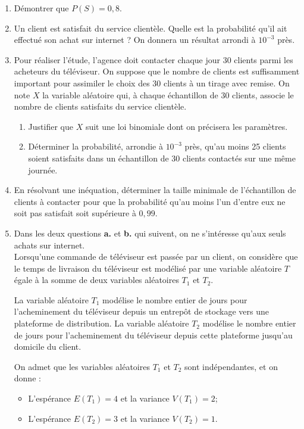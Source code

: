 \documentclass[10pt]{article}
\begin{document}
\begin{enumerate}
	\item Démontrer que $P(S)=0,8$.

	\item Un client est satisfait du service clientèle. Quelle est la probabilité qu'il ait effectué son achat sur internet ? On donnera un résultat arrondi à $10^{-3}$ près.

	\item Pour réaliser l'étude, l'agence doit contacter chaque jour 30 clients parmi les acheteurs du téléviseur. On suppose que le nombre de clients est suffisamment important pour assimiler le choix des 30 clients à un tirage avec remise. On note $X$ la variable aléatoire qui, à chaque échantillon de 30 clients, associe le nombre de clients satisfaits du service clientèle.

	\begin{enumerate}
		\item Justifier que $X$ suit une loi binomiale dont on précisera les paramètres.
		\item Déterminer la probabilité, arrondie à $10^{-3}$ près, qu'au moins 25 clients soient satisfaits dans un échantillon de 30 clients contactés sur une même journée.
	\end{enumerate}

	\item En résolvant une inéquation, déterminer la taille minimale de l'échantillon de clients à contacter pour que la probabilité qu'au moins l'un d'entre eux ne soit pas satisfait soit supérieure à $0,99$.

	\item Dans les deux questions \textbf{a.} et \textbf{b.} qui suivent, on ne s'intéresse qu'aux seuls achats sur internet.\\
	Lorsqu'une commande de téléviseur est passée par un client, on considère que le temps de livraison du téléviseur est modélisé par une variable aléatoire $T$ égale à la somme de deux variables aléatoires $T_{1}$ et $T_{2}$.

	La variable aléatoire $T_{1}$ modélise le nombre entier de jours pour l'acheminement du téléviseur depuis un entrepôt de stockage vers une plateforme de distribution. La variable aléatoire $T_{2}$ modélise le nombre entier de jours pour l'acheminement du téléviseur depuis cette plateforme jusqu'au domicile du client.

	On admet que les variables aléatoires $T_{1}$ et $T_{2}$ sont indépendantes, et on donne :
	\begin{itemize}
		\item L'espérance $E\left(T_{1}\right)=4$ et la variance $V\left(T_{1}\right)=2$;
		\item L'espérance $E\left(T_{2}\right)=3$ et la variance $V\left(T_{2}\right)=1$.
	\end{itemize}


\end{enumerate}
\end{document}
